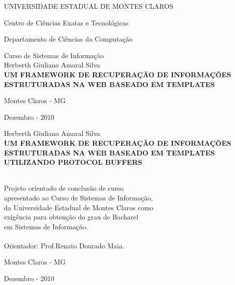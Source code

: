 \documentclass[a4paper]{report}
\begin{document}
\begin{titlepage}
\begin{center}
UNIVERSIDADE ESTADUAL DE MONTES CLAROS

Centro de Ciências Exatas e Tecnológicas

Departamento de Ciências da Computação

Curso de Sistemas de Informação
\\[2cm]
Herberth Giuliano Amaral Silva
\\[7cm]
\textbf {UM FRAMEWORK DE RECUPERAÇÃO DE INFORMAÇÕES ESTRUTURADAS NA WEB BASEADO EM TEMPLATES}

\vfill
Montes Claros - MG

Dezembro - 2010



\end{center}
\end{titlepage}

\thispagestyle{empty}
\addtocounter{page}{-1}

\begin{center}
	Herberth Giuliano Amaral Silva
	\\[10cm]
	\textbf{UM FRAMEWORK DE RECUPERAÇÃO DE INFORMAÇÕES ESTRUTURADAS NA WEB BASEADO EM TEMPLATES UTILIZANDO PROTOCOL BUFFERS}
		
	\begin{flushright} 
	\ \\[3cm]
	Projeto orientado de conclusão de curso \\
	apresentado ao Curso de Sistemas de Informação, \\
	da Universidade Estadual de Montes Claros como \\
	exigência para obtenção do grau de Bacharel \\
	em Sistemas de Informação. \\
 	\ \\[1cm]
	Orientador: Prof.Renato Dourado Maia.

	\end{flushright}
	
	\vfill
	Montes Claros - MG
	
	Dezembro - 2010 
\end{center}


\renewcommand{\contentsname}{Índice}
\renewcommand{\chaptername}{Capítulo}
\renewcommand{\bibname}{Bibliografia}
\renewcommand{\lstlistingname}{Listagem}

\def\us{\char`\_}

\tableofcontents

\doublespacing







\clearpage
{}


\end{document}
